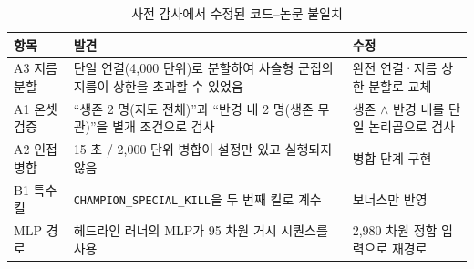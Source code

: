 \begin{table}[htbp]
  \centering
  \caption{사전 감사에서 수정된 코드--논문 불일치}
  \label{tab:audit}
  \small
  \begin{tabularx}{\linewidth}{@{}lXX@{}}
    \toprule
    항목 & 발견 & 수정 \\
    \midrule
    A3 지름 분할 & 단일 연결(4{,}000 단위)로 분할하여 사슬형 군집의 지름이 상한을 초과할 수 있었음 & 완전 연결·지름 상한 분할로 교체 \\
    A1 온셋 검증 & ``생존 2 명(지도 전체)''과 ``반경 내 2 명(생존 무관)''을 별개 조건으로 검사 & 생존 $\wedge$ 반경 내를 단일 논리곱으로 검사 \\
    A2 인접 병합 & 15 초 / 2{,}000 단위 병합이 설정만 있고 실행되지 않음 & 병합 단계 구현 \\
    B1 특수 킬 & \texttt{CHAMPION\_SPECIAL\_KILL}을 두 번째 킬로 계수 & 보너스만 반영 \\
    MLP 경로 & 헤드라인 러너의 MLP가 95 차원 거시 시퀀스를 사용 & 2{,}980 차원 정합 입력으로 재경로 \\
    \bottomrule
  \end{tabularx}
\end{table}
